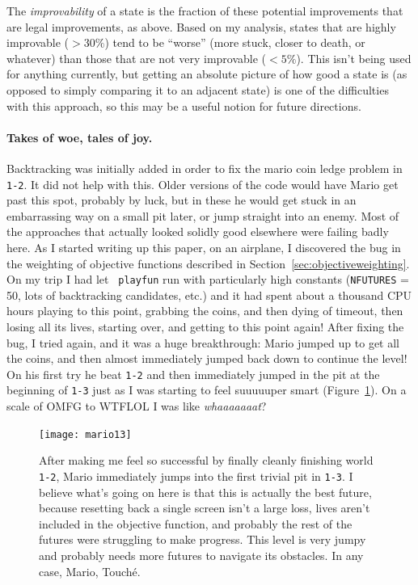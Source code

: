 \documentclass[twocolumn]{article}
\begin{document}
The {\em improvability} of a state is the fraction of these potential
improvements that are legal improvements, as above. Based on my
analysis, states that are highly improvable ($> 30\%$) tend to be
``worse'' (more stuck, closer to death, or whatever) than those that
are not very improvable ($< 5\%$). This isn't being used for anything
currently, but getting an absolute picture of how good a state is (as
opposed to simply comparing it to an adjacent state) is one of the
difficulties with this approach, so this may be a useful notion for
future directions.

\paragraph{Takes of woe, tales of joy.} 
Backtracking was initially added in order to fix the mario coin ledge
problem in {\tt 1-2}. It did not help with this. Older versions of the
code would have Mario get past this spot, probably by luck, but in
these he would get stuck in an embarrassing way on a small pit later,
or jump straight into an enemy. Most of the approaches that actually
looked solidly good elsewhere were failing badly here. As I started
writing up this paper, on an airplane, I discovered the bug in the
weighting of objective functions described in
Section~\ref{sec:objectiveweighting}. On my trip I had let {\tt
  playfun} run with particularly high constants ({\tt NFUTURES} = 50,
lots of backtracking candidates, etc.) and it had spent about a
thousand CPU hours playing to this point, grabbing the coins, and then
dying of timeout, then losing all its lives, starting over, and
getting to this point again! After fixing the bug, I tried again, and
it was a huge breakthrough: Mario jumped up to get all the coins, and
then almost immediately jumped back down to continue the level! On his
first try he beat {\tt 1-2} and then immediately jumped in the pit at
the beginning of {\tt 1-3} just as I was starting to feel suuuuuper
smart (Figure~\ref{fig:mario13}). On a scale of OMFG to WTFLOL I was
like {\em whaaaaaaat}?

\begin{figure}[hb]
\begin{center}
\texttt{[image: mario13]}
\end{center}\vspace{-0.1in}
\caption{After making me feel so successful by finally cleanly
  finishing world {\tt 1-2}, Mario immediately jumps into the first
  trivial pit in {\tt 1-3}. I believe what's going on here is that
  this is actually the best future, because resetting back a single
  screen isn't a large loss, lives aren't included in the objective
  function, and probably the rest of the futures were struggling to
  make progress. This level is very jumpy and probably needs more
  futures to navigate its obstacles. In any case, Mario, Touch\'e.}
\label{fig:mario13}
\end{figure}
\end{document}
